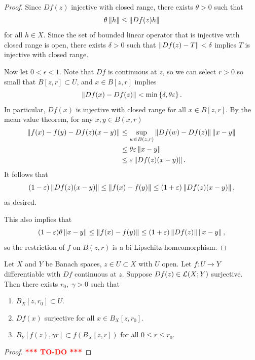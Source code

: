 \documentclass[a4paper]{article}
\newcommand{\TODO}{\textcolor{red}{\textbf{*** TO-DO ***}}}
\begin{document}
\begin{proof}

Since $Df(z)$ injective with closed range, there exists
$\theta > 0$ such that
\[
\theta \left\lVert h\right\rVert \leq \left\lVert Df(z) h\right\rVert
\]
for all $h \in X$. Since the set of bounded linear operator
that is injective with closed range is open, there exists
$\delta > 0$ such that $\left\lVert Df(z) - T\right\rVert < \delta$ implies
$T$ is injective with closed range.

Now let $0 < \epsilon < 1$. Note that $Df$
is continuous at $z$, so we can select $r > 0$ so small
that $B[z, r] \subset U$, and $x \in B[z, r]$ implies
\[
\left\lVert Df(x) - Df(z)\right\rVert < \min \left\{ \delta, \theta \varepsilon \right\}.
\]
In particular, $Df(x)$ is injective with closed range
for all $x \in B[z, r]$. By the mean value theorem,
for any $x, y \in B(x, r)$
\[
\begin{aligned}
\left\lVert f(x) - f(y) - Df(z) (x - y)\right\rVert
&\leq \sup_{w \in B(z, r)} \left\lVert Df(w) - Df(z)\right\rVert \left\lVert x - y\right\rVert \\
&\leq \theta \varepsilon \left\lVert x - y\right\rVert \\
&\leq \varepsilon \left\lVert Df(z) (x - y)\right\rVert.
\end{aligned}
\]
It follows that
\[
(1 - \varepsilon) \left\lVert Df(z)(x - y)\right\rVert
\leq \left\lVert f(x) - f(y)\right\rVert
\leq (1 + \varepsilon) \left\lVert Df(z) (x - y)\right\rVert,
\]
as desired.

This also implies that
\[
(1 - \varepsilon) \theta \left\lVert x - y\right\rVert
\leq \left\lVert f(x) - f(y)\right\rVert \leq (1 + \varepsilon)
\left\lVert Df(z)\right\rVert \left\lVert x - y\right\rVert,
\]
so the restriction of $f$ on $B(z, r)$ is a bi-Lipschitz
homeomorphism.

\end{proof}

\begin{thm}
Let $X$ and $Y$ be Banach spaces, $z \in U \subset X$ with
$U$ open. Let $f: U \to Y$ differentiable with
$Df$ continuous at $z$. Suppose $Df(z) \in \mathcal{L}(X; Y)$
surjective. Then there exists $r_0, \; \gamma > 0$ such that
\begin{enumerate}
  \item $B_X[z, r_0] \subset U$.
  \item $Df(x)$ surjective for all $x \in B_X[z, r_0]$.
  \item $B_Y[f(z), \gamma r] \subset f(B_X[z, r])$ for all
  $0 \leq r \leq r_0$.
\end{enumerate}
\end{thm}

\begin{proof}

\TODO

\end{proof}
\end{document}

